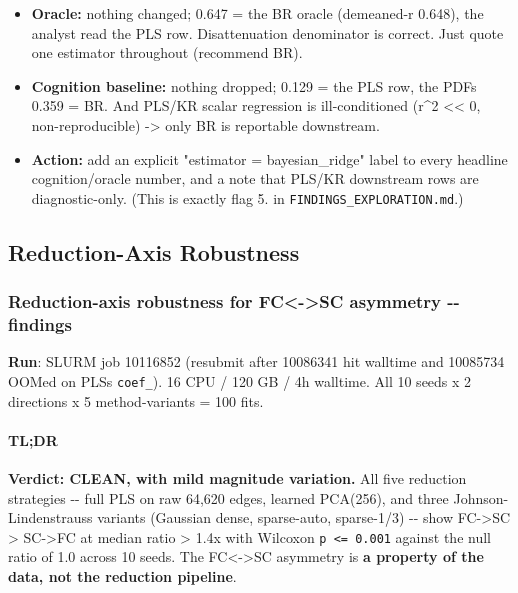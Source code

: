\begin{itemize}
\tightlist
\item
  \textbf{Oracle:} nothing changed; 0.647 = the BR oracle (demeaned-r 0.648), the analyst read the PLS row. Disattenuation denominator is correct. Just quote one estimator throughout (recommend BR).
\item
  \textbf{Cognition baseline:} nothing dropped; 0.129 = the PLS row, the PDF\textquotesingle s 0.359 = BR. And PLS/KR scalar regression is ill-conditioned (r\^{}2 \textless\textless{} 0, non-reproducible) -\textgreater{} only BR is reportable downstream.
\item
  \textbf{Action:} add an explicit "estimator = bayesian\_ridge" label to every headline cognition/oracle number, and a note that PLS/KR downstream rows are diagnostic-only. (This is exactly flag 5. in \texttt{FINDINGS\_EXPLORATION.md}.)
\end{itemize}

\subsection{Reduction-Axis Robustness}\label{reduction-axis-robustness}

\subsubsection{Reduction-axis robustness for FC\textless-\textgreater SC asymmetry -\/- findings}\label{reduction-axis-robustness-for-fc-sc-asymmetry----findings}

\textbf{Run}: SLURM job 10116852 (resubmit after 10086341 hit walltime and 10085734 OOMed on PLS\textquotesingle s \texttt{coef\_}). 16 CPU / 120 GB / 4h walltime. All 10 seeds x 2 directions x 5 method-variants = 100 fits.

\paragraph{TL;DR}\label{tldr}

\textbf{Verdict: CLEAN, with mild magnitude variation.} All five reduction strategies -\/- full PLS on raw 64,620 edges, learned PCA(256), and three Johnson-Lindenstrauss variants (Gaussian dense, sparse-auto, sparse-1/3) -\/- show FC-\textgreater SC \textgreater{} SC-\textgreater FC at median ratio \textgreater{} 1.4x with Wilcoxon \texttt{p\ \textless{}=\ 0.001} against the null ratio of 1.0 across 10 seeds. The FC\textless-\textgreater SC asymmetry is \textbf{a property of the data, not the reduction pipeline}.

